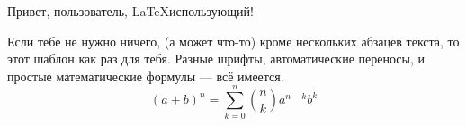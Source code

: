 \documentclass[12pt]{article}
\begin{document}
{\LARGE Привет, пользователь, \LaTeX использующий!}
\bigskip

Если тебе не нужно ничего, (а может что-то) кроме нескольких абзацев текста, то этот шаблон как раз для тебя.
{ Разные шрифты}, автоматические переносы, и простые математические
формулы --- всё имеется.
\Large
$$
(a + b)^n = \sum_{k=0}^n{n\choose k}a^{n-k}b^k
$$

\bigskip
{}
\end{document}
